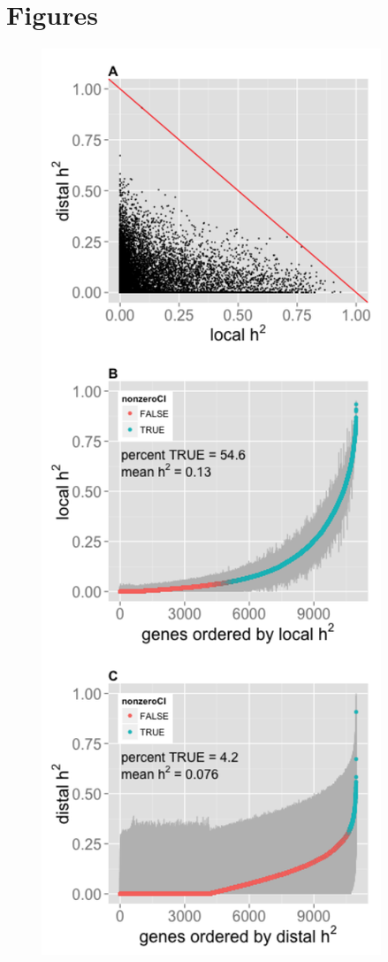\documentclass[]{article}
\begin{document}
\section{Figures}\label{figures}

\begin{figure}[htbp]
\centering
\includegraphics{GenArch_manuscript_files/figure-latex/jointH2-1.pdf}

\end{figure}
\end{document}
